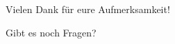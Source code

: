 \documentclass[aspectratio=169]{beamer}
\begin{document}
\section{}
\subsection{}
\begin{frame}{}
    \begin{center}
        {\Huge Vielen Dank für eure Aufmerksamkeit!}
        
        \vspace{0.8cm}
        
        {\huge Gibt es noch Fragen?}
    \end{center}
\end{frame}
\end{document}

